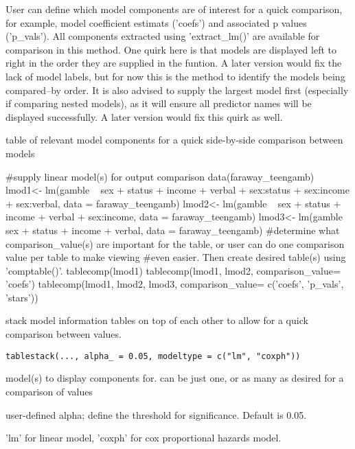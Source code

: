 \documentclass[a4paper]{book}
\begin{document}
\begin{Details}
User can define which model components are of interest for a quick comparison, for example, model coefficient estimats ('coefs') and associated p values ('p\_vals'). All components extracted
using 'extract\_lm()' are available for comparison in this method. One quirk here is that models are displayed left to right in the order they are supplied in the funtion. A later version would fix the
lack of model labels, but for now this is the method to identify the models being compared--by order. It is also advised to supply the largest model first (especially if comparing nested models), as it will
ensure all predictor names will be displayed successfully. A later version would fix this quirk as well.
\end{Details}
%
\begin{Value}
table of relevant model components for a quick side-by-side comparison between models
\end{Value}
%
\begin{Examples}
\begin{ExampleCode}
#supply linear model(s) for output comparison
 data(faraway_teengamb)
 lmod1<- lm(gamble ~ sex + status + income + verbal + sex:status + sex:income + sex:verbal, data = faraway_teengamb)
 lmod2<- lm(gamble ~ sex + status + income + verbal + sex:income, data = faraway_teengamb)
 lmod3<- lm(gamble ~ sex + status + income + verbal, data = faraway_teengamb)
#determine what comparison_value(s) are important for the table, or user can do one comparison value per table to make viewing
#even easier. Then create desired table(s) using 'comptable()'.
tablecomp(lmod1)
tablecomp(lmod1, lmod2, comparison_value= 'coefs')
tablecomp(lmod1, lmod2, lmod3, comparison_value= c('coefs', 'p_vals', 'stars'))

\end{ExampleCode}
\end{Examples}
%
\begin{Description}
stack model information tables on top of each other to allow for a quick comparison between values.
\end{Description}
%
\begin{Usage}
\begin{verbatim}
tablestack(..., alpha_ = 0.05, modeltype = c("lm", "coxph"))
\end{verbatim}
\end{Usage}
%
\begin{Arguments}
\begin{ldescription}
\item[\code{...}] model(s) to display components for. can be just one, or as many as desired for a comparison of values

\item[\code{alpha\_}] user-defined alpha; define the threshold for significance. Default is 0.05.

\item[\code{modeltype}] 'lm' for linear model, 'coxph' for cox proportional hazards model.
\end{ldescription}
\end{Arguments}
\end{document}
